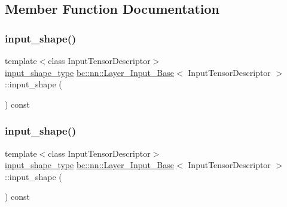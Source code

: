 \subsection{Member Function Documentation}
\mbox{\label{classbc_1_1nn_1_1Layer__Input__Base_ab7d41ba8f59817a76ceecd13b47f101a}} 
\subsubsection{\texorpdfstring{input\+\_\+shape()}{input\_shape()}\hspace{0.1cm}{\footnotesize\ttfamily [1/2]}}
{\footnotesize\ttfamily template$<$class Input\+Tensor\+Descriptor$>$ \\
\hyperlink{structbc_1_1Dim}{input\+\_\+shape\+\_\+type} \hyperlink{classbc_1_1nn_1_1Layer__Input__Base}{bc\+::nn\+::\+Layer\+\_\+\+Input\+\_\+\+Base}$<$ Input\+Tensor\+Descriptor $>$\+::input\+\_\+shape (\begin{DoxyParamCaption}{ }\end{DoxyParamCaption}) const\hspace{0.3cm}{\ttfamily [inline]}}

\mbox{\label{classbc_1_1nn_1_1Layer__Input__Base_ab7d41ba8f59817a76ceecd13b47f101a}} 
\subsubsection{\texorpdfstring{input\+\_\+shape()}{input\_shape()}\hspace{0.1cm}{\footnotesize\ttfamily [2/2]}}
{\footnotesize\ttfamily template$<$class Input\+Tensor\+Descriptor$>$ \\
\hyperlink{structbc_1_1Dim}{input\+\_\+shape\+\_\+type} \hyperlink{classbc_1_1nn_1_1Layer__Input__Base}{bc\+::nn\+::\+Layer\+\_\+\+Input\+\_\+\+Base}$<$ Input\+Tensor\+Descriptor $>$\+::input\+\_\+shape (\begin{DoxyParamCaption}{ }\end{DoxyParamCaption}) const\hspace{0.3cm}{\ttfamily [inline]}}


